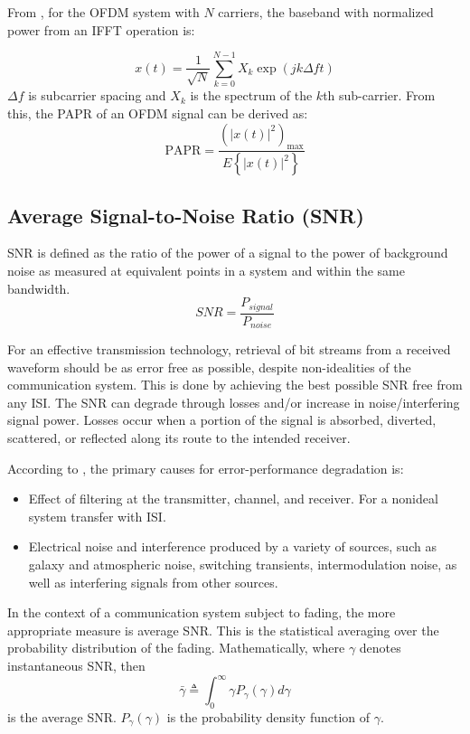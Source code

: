 From \cite{papr_paper}, for the \gls{OFDM} system with $N$ carriers, the baseband with normalized power from an \gls{IFFT} operation is:

$$x(t) = \frac{1}{\sqrt{N}}\sum_{k=0}^{N-1}X_k\exp (jk\Delta ft)$$
$\Delta f$ is subcarrier spacing and $X_k$ is the spectrum of the $k$th sub-carrier.
From this, the \gls{PAPR} of an \gls{OFDM} signal can be derived as:
$$\text{PAPR} = \frac{\left(\left|x(t)\right|^2\right)_{\max}}{E\left\{\left|x(t)\right|^2\right\}}$$

\subsection{Average Signal-to-Noise Ratio (\gls{SNR})}
\gls{SNR} is defined as the ratio of the power of a signal to the power of background noise as measured at equivalent points in a system and within the same bandwidth.\cite{dcommoha}
$$SNR = \frac{P_{signal}}{P_{noise}}$$

For an effective transmission technology, retrieval of bit streams from a received waveform  should be as error free as possible, despite non-idealities of the communication system. This is done by achieving the best possible \gls{SNR} free from any \gls{ISI}. The \gls{SNR} can degrade through losses and/or increase in noise/interfering signal power. Losses occur when a portion of the signal is absorbed, diverted, scattered, or reflected along its route to the intended receiver.

According to \cite{AWGN}, the primary causes for error-performance degradation is:
\begin{itemize}
	\item Effect of filtering at the transmitter, channel, and receiver. For a nonideal system transfer with
\gls{ISI}.
	\item  Electrical noise and interference produced by a variety of sources, such as galaxy and
	atmospheric noise, switching transients, intermodulation noise, as well as interfering signals
	from other sources.
\end{itemize}
	
In the context of a communication system subject to fading, the more appropriate measure is average \gls{SNR}. This is the statistical averaging over the probability distribution of the fading. Mathematically, where $\gamma$ denotes instantaneous \gls{SNR}, then
$$\bar{\gamma} \triangleq \int_0^{\infty} \gamma P_{\gamma} \left(\gamma\right) d\gamma$$
is the average \gls{SNR}. $P_{\gamma} \left(\gamma\right)$ is the probability density function of $\gamma$.
